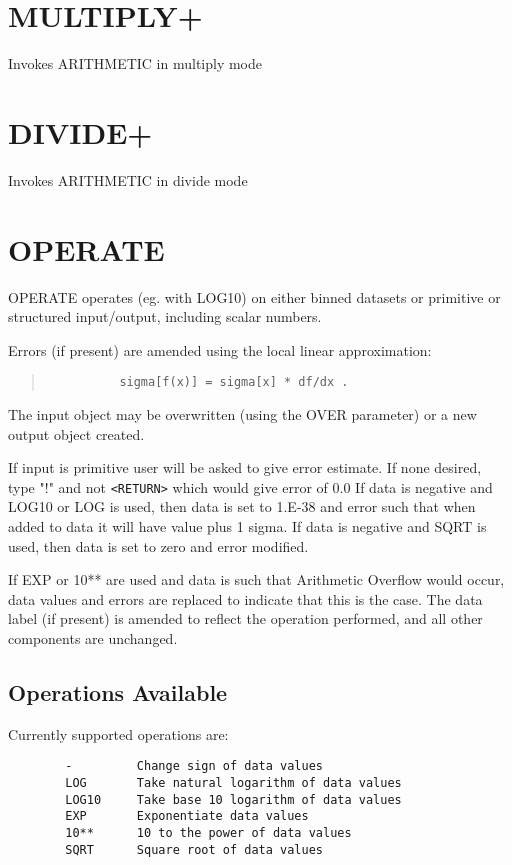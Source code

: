 \documentclass{book}
\renewcommand{\_}{{\tt\char'137}}     %
\begin{document}
\section{MULTIPLY+}
Invokes ARITHMETIC in multiply mode
\section{DIVIDE+}
Invokes ARITHMETIC in divide mode
\section{OPERATE}
OPERATE operates (eg. with LOG10) on either binned datasets or
primitive or structured input/output, including scalar numbers.

Errors (if present) are amended using the local linear
approximation:

\begin{quote}\begin{verbatim}
          sigma[f(x)] = sigma[x] * df/dx .
\end{verbatim}\end{quote}
The input object may be overwritten (using the OVER parameter) or
a new output object created.

If input is primitive user will be asked to give error estimate.
If none desired, type "!" and not \verb+<RETURN>+ which would give
error of 0.0 If data is negative and LOG10 or LOG is used, then
data is set to 1.E-38 and error such that when added to data it
will have value plus 1 sigma. If data is negative and SQRT is
used, then data is set to zero and error modified.

If EXP or 10** are used and data is such that Arithmetic Overflow
would occur, data values and errors are replaced to indicate that
this is the case. The data label (if present) is amended to
reflect the operation performed, and all other components are
unchanged.

\subsection{Operations Available}
Currently supported operations are:
\begin{verbatim}
        -         Change sign of data values
        LOG       Take natural logarithm of data values
        LOG10     Take base 10 logarithm of data values
        EXP       Exponentiate data values
        10**      10 to the power of data values
        SQRT      Square root of data values
\end{verbatim}
\end{document}

